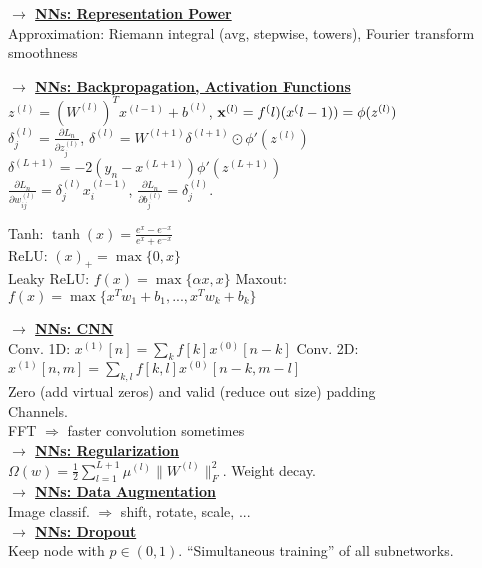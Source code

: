 \documentclass[]{article}
\newcommand{\myvector}[1]{{\bf{#1}}}
\newcommand{\x}{\myvector{x}}
\newcommand{\mytitle}[1]{ {\bf $\rightarrow$ \underline{#1}}\\}
\begin{document}
\begin{multicols*}{2}
\mytitle{NNs: Representation Power}
Approximation: Riemann integral (avg, stepwise, towers), Fourier transform smoothness

\mytitle{NNs: Backpropagation, Activation Functions}
$z^({l})=(W^{(l)})^Tx^{(l-1)}+b^{(l)}$, $\x^{(l)}=f^({l})(x^({l-1}))=\phi(z^{(l)})$\\
$\delta_j^{(l)}=\frac{\partial L_n}{\partial z_j^{(l)}}$, $\delta^{(l)}=W^{(l+1)}\delta^{(l+1)}\odot \phi'(z^{(l)})$\\
$\delta^{(L+1)}=-2(y_n-x^{(L+1)})\phi'(z^{(L+1)})$\\
$\frac{\partial L_n}{\partial w_{ij}^{(l)}}=\delta^{(l)}_jx_i^{(l-1)}$,
$\frac{\partial L_n}{\partial b_{j}^{(l)}}=\delta^{(l)}_j$.

Tanh: $\tanh(x)=\frac{e^x-e^{-x}}{e^x+e^{-x}}$\\
ReLU: $(x)_+=\max\{0, x\}$\\
Leaky ReLU: $f(x)=\max\{\alpha x, x\}$
Maxout: $f(x)=\max\{x^Tw_1+b_1,...,x^Tw_k+b_k\}$

\mytitle{NNs: CNN}
Conv. 1D: $x^{(1)}[n]=\sum\limits_kf[k]x^{(0)}[n-k]$
Conv. 2D: $x^{(1)}[n,m]=\sum\limits_{k,l}f[k,l]x^{(0)}[n-k,m-l]$\\
Zero (add virtual zeros) and valid (reduce out size) padding\\
Channels.\\
FFT $\Rightarrow$ faster convolution sometimes\\

\mytitle{NNs: Regularization}
$\Omega(w)=\frac{1}{2}\sum\limits_{l=1}^{L+1}\mu^{(l)}\|W^{(l)}\|_F^2$. Weight decay.\\

\mytitle{NNs: Data Augmentation}
Image classif. $\Rightarrow$ shift, rotate, scale, ...\\

\mytitle{NNs: Dropout}
Keep node with $p\in(0,1)$. ``Simultaneous training'' of all subnetworks.


\end{multicols*}
\end{document}
